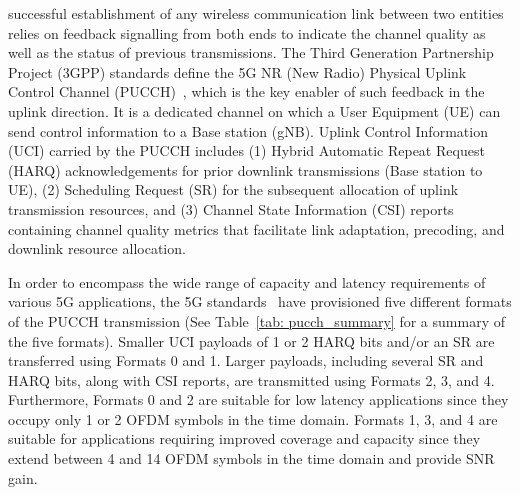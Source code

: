 \documentclass[journal]{IEEEtran}
\begin{document}
 successful establishment of any wireless communication link between two entities relies on feedback signalling from both ends to indicate the channel quality as well as the status of previous transmissions. The Third Generation Partnership Project (3GPP) standards define the 5G NR (New Radio) Physical Uplink Control Channel (PUCCH)~\cite{5g_bullets}, which is the key enabler of such feedback in the uplink direction. It is a dedicated channel on which a User Equipment (UE) can send control information to a Base station (gNB). Uplink Control Information (UCI) carried by the PUCCH includes (1) Hybrid Automatic Repeat Request (HARQ) acknowledgements for prior downlink transmissions (Base station to UE), (2) Scheduling Request (SR) for the subsequent allocation of uplink transmission resources, and (3) Channel State Information (CSI) reports containing channel quality metrics that facilitate link adaptation, precoding, and downlink resource allocation. 

            In order to encompass the wide range of capacity and latency requirements of various 5G applications, the 5G standards~\cite{3gpp_38_211, 3gpp_38_212, 3gpp_38_213} have provisioned five different formats of the PUCCH transmission (See Table~\ref{tab: pucch_summary} for a summary of the five formats). Smaller UCI payloads of 1 or 2 HARQ bits and/or an SR are transferred using Formats 0 and 1. Larger payloads, including several SR and HARQ bits, along with CSI reports, are transmitted using Formats 2, 3, and 4. Furthermore, Formats 0 and 2 are suitable for low latency applications since they occupy only 1 or 2 OFDM symbols in the time domain. Formats 1, 3, and 4 are suitable for applications requiring improved coverage and capacity since they extend between 4 and 14 OFDM symbols in the time domain and provide SNR gain. 
\end{document}
